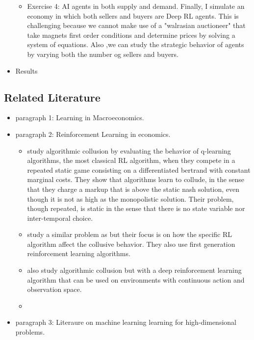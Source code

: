 \documentclass[11pt,english]{article}
\begin{document}
\begin{itemize}
\begin{itemize}
		\item Exercise 4: AI agents in both supply and demand. Finally, I  simulate an economy in which both sellers and buyers are Deep RL agents. This is challenging because we cannot make use of a "walrasian auctioneer" that take magnets first order conditions and determine prices by solving a system of equations. Also ,we can study the strategic behavior of agents by varying both the number og sellers and buyers. \medskip
		
		
		
		
	
	\end{itemize}

	
	\item Results
	
\end{itemize}
	
	\subsection{Related Literature}
	
	\begin{itemize}
		\item paragraph 1: Learning in Macroeconomics. \medskip
		
		\item paragraph 2: Reinforcement Learning in economics. \medskip
		
		\begin{itemize}
			\item \citet{calvano2020} study algorithmic collusion by evaluating the behavior of q-learning algorithms, the most classical RL algorithm, when they compete in a repeated static game consisting on a differentiated bertrand with constant marginal costs. They show that algorithms learn to collude, in the sense that they charge a markup that is above the static nash solution, even though it is not as high as the monopolistic solution. Their problem, though repeated, is static in the sense that there is no state variable nor inter-temporal choice. 
			
			\item \citet{asker2021} study a similar problem as \citet{calvano2020} but their focus is on how the specific RL algorithm affect the collusive behavior. They also use first generation reinforcement learning algorithms.
			
			\item \citet{graf2021} also study algorithmic collusion but with a deep reinforcement learning algorithm that can be used on environments with continuous action and observation space.
			
			\item 
			
		\end{itemize}
		
		\item paragraph 3: Literaure on machine learning learning for high-dimensional problems.
	\end{itemize}
	
\end{document}
